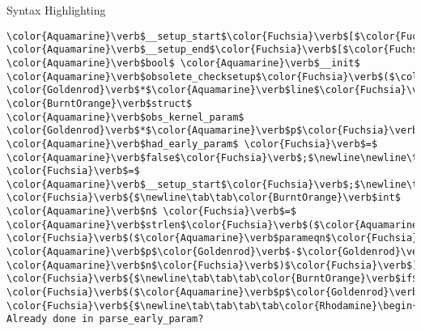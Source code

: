\begin{frame}{Syntax Highlighting}
\begin{verbatim}
\color{Aquamarine}\verb$__setup_start$\color{Fuchsia}\verb$[$\color{Fuchsia}\verb$]$\color{Fuchsia}\verb$,$ \color{Aquamarine}\verb$__setup_end$\color{Fuchsia}\verb$[$\color{Fuchsia}\verb$]$\color{Fuchsia}\verb$;$\newline\newline\color{BurntOrange}\verb$static$ \color{Aquamarine}\verb$bool$ \color{Aquamarine}\verb$__init$ \color{Aquamarine}\verb$obsolete_checksetup$\color{Fuchsia}\verb$($\color{BurntOrange}\verb$char$ \color{Goldenrod}\verb$*$\color{Aquamarine}\verb$line$\color{Fuchsia}\verb$)$\newline\color{Fuchsia}\verb${$\newline\tab\color{BurntOrange}\verb$const$ \color{BurntOrange}\verb$struct$ \color{Aquamarine}\verb$obs_kernel_param$ \color{Goldenrod}\verb$*$\color{Aquamarine}\verb$p$\color{Fuchsia}\verb$;$\newline\tab\color{Aquamarine}\verb$bool$ \color{Aquamarine}\verb$had_early_param$ \color{Fuchsia}\verb$=$ \color{Aquamarine}\verb$false$\color{Fuchsia}\verb$;$\newline\newline\tab\color{Aquamarine}\verb$p$ \color{Fuchsia}\verb$=$ \color{Aquamarine}\verb$__setup_start$\color{Fuchsia}\verb$;$\newline\tab\color{BurntOrange}\verb$do$ \color{Fuchsia}\verb${$\newline\tab\tab\color{BurntOrange}\verb$int$ \color{Aquamarine}\verb$n$ \color{Fuchsia}\verb$=$ \color{Aquamarine}\verb$strlen$\color{Fuchsia}\verb$($\color{Aquamarine}\verb$p$\color{Goldenrod}\verb$-$\color{Goldenrod}\verb$>$\color{Aquamarine}\verb$str$\color{Fuchsia}\verb$)$\color{Fuchsia}\verb$;$\newline\tab\tab\color{BurntOrange}\verb$if$ \color{Fuchsia}\verb$($\color{Aquamarine}\verb$parameqn$\color{Fuchsia}\verb$($\color{Aquamarine}\verb$line$\color{Fuchsia}\verb$,$ \color{Aquamarine}\verb$p$\color{Goldenrod}\verb$-$\color{Goldenrod}\verb$>$\color{Aquamarine}\verb$str$\color{Fuchsia}\verb$,$ \color{Aquamarine}\verb$n$\color{Fuchsia}\verb$)$\color{Fuchsia}\verb$)$ \color{Fuchsia}\verb${$\newline\tab\tab\tab\color{BurntOrange}\verb$if$ \color{Fuchsia}\verb$($\color{Aquamarine}\verb$p$\color{Goldenrod}\verb$-$\color{Goldenrod}\verb$>$\color{Aquamarine}\verb$early$\color{Fuchsia}\verb$)$ \color{Fuchsia}\verb${$\newline\tab\tab\tab\tab\color{Rhodamine}\begin{verbatim}/* Already done in parse_early_param?

\end{verbatim}
\end{frame}
